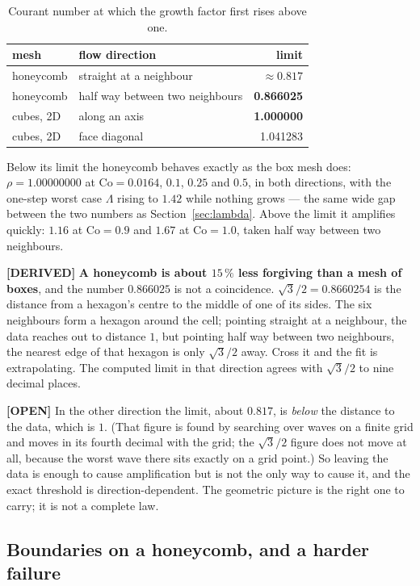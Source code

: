 \documentclass[11pt,a4paper]{article}
\newcommand{\derived}{\textcolor{blue!50!black}{\textbf{[DERIVED]}}}
\newcommand{\opn}{\textcolor{orange!80!black}{\textbf{[OPEN]}}}
\begin{document}
\begin{table}[h]
\centering
\caption{Courant number at which the growth factor first rises above one.}
\label{tab:hexlimit}
\begin{tabular}{llr}
\toprule
mesh & flow direction & limit \\
\midrule
honeycomb & straight at a neighbour         & $\approx 0.817$ \\
honeycomb & half way between two neighbours & \textbf{0.866025} \\
cubes, 2D & along an axis                   & \textbf{1.000000} \\
cubes, 2D & face diagonal                   & 1.041283 \\
\bottomrule
\end{tabular}
\end{table}

Below its limit the honeycomb behaves exactly as the box mesh does: $\rho = 1.00000000$ at
$\mathrm{Co} = 0.0164$, $0.1$, $0.25$ and $0.5$, in both directions, with the one-step worst
case $\Lambda$ rising to $1.42$ while nothing grows --- the same wide gap between the two
numbers as Section~\ref{sec:lambda}. Above the limit it amplifies quickly: $1.16$ at
$\mathrm{Co} = 0.9$ and $1.67$ at $\mathrm{Co} = 1.0$, taken half way between two neighbours.

\derived{} \textbf{A honeycomb is about $15\,\%$ less forgiving than a mesh of boxes}, and the
number $0.866025$ is not a coincidence. $\sqrt3/2 = 0.8660254$ is the distance from a
hexagon's centre to the middle of one of its sides. The six neighbours form a hexagon around
the cell; pointing straight at a neighbour, the data reaches out to distance $1$, but pointing
half way between two neighbours, the nearest edge of that hexagon is only $\sqrt3/2$ away.
Cross it and the fit is extrapolating. The computed limit in that direction agrees with
$\sqrt3/2$ to nine decimal places.

\opn{} In the other direction the limit, about $0.817$, is \emph{below} the distance to the
data, which is $1$. (That figure is found by searching over waves on a finite grid and moves
in its fourth decimal with the grid; the $\sqrt3/2$ figure does not move at all, because the
worst wave there sits exactly on a grid point.) So leaving the data is enough to cause amplification but is not the
only way to cause it, and the exact threshold is direction-dependent. The geometric picture is
the right one to carry; it is not a complete law.

\subsection{Boundaries on a honeycomb, and a harder failure}
\end{document}
